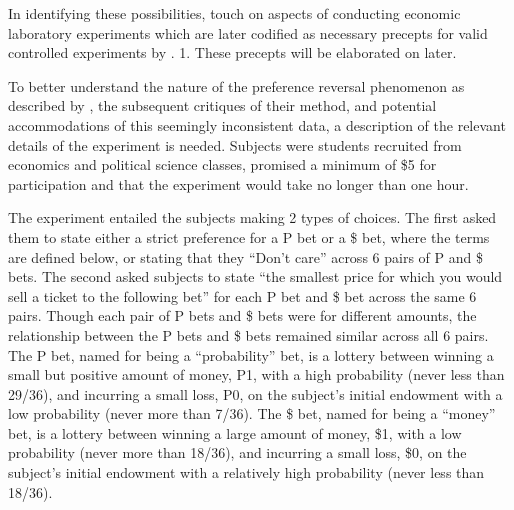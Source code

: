 In identifying these possibilities, \textcite{Grether1979} touch on aspects of conducting economic laboratory experiments which are later codified as necessary precepts for valid controlled experiments by \textcite{Smith1982}.
1. 
These precepts will be elaborated on later.

To better understand the nature of the preference reversal phenomenon as described by \textcite{Grether1979}, the subsequent critiques of their method, and potential accommodations of this seemingly inconsistent data, a description of the relevant details of the experiment is needed.
Subjects were students recruited from economics and political science classes, promised a minimum of \$5 for participation and that the experiment would take no longer than one hour.

The experiment entailed the subjects making 2 types of choices.
The first asked them to state either a strict preference for a P bet or a \$ bet, where the terms are defined below, or stating that they \enquote{Don't care} across 6 pairs of P and \$ bets.
The second asked subjects to state \enquote{the smallest price for which you would sell a ticket to the following bet} \parencite*[630]{Grether1979} for each P bet and \$ bet across the same 6 pairs.
Though each pair of P bets and \$ bets were for different amounts, the relationship between the P bets and \$ bets remained similar across all 6 pairs.
The P bet, named for being a \enquote{probability} bet, is a lottery between winning a small but positive amount of money, P1, with a high probability (never less than 29/36), and incurring a small loss, P0, on the subject's initial endowment with a low probability (never more than 7/36).
The \$ bet, named for being a \enquote{money} bet, is a lottery between winning a large amount of money, \$1, with a  low probability (never more than 18/36), and incurring a small loss, \$0, on the subject's initial endowment with a relatively high probability (never less than 18/36).

